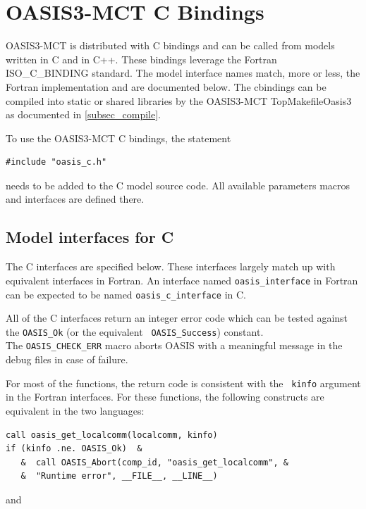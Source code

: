 \newpage
\chapter{OASIS3-MCT C Bindings}
\label{sec_cbindings}

OASIS3-MCT is distributed with C bindings and can be called from models written
in C and in C++.  These bindings leverage the Fortran ISO\_C\_BINDING standard.  The model
interface names match, more or less, the Fortran implementation and are documented
below.  The cbindings can be compiled into static or shared libraries by the
OASIS3-MCT TopMakefileOasis3 as documented in \ref{subsec_compile}.

To use the OASIS3-MCT C bindings, the statement

\begin{verbatim}
#include "oasis_c.h"
\end{verbatim}

needs to be added to the C model source code.  All available
parameters macros and
interfaces are defined there.


\section{Model interfaces for C}
\label{sec_cinterfaces}

The C interfaces are specified below.  These interfaces largely match
up with equivalent interfaces in Fortran.  An interface named
{\tt oasis\_interface} in Fortran can be expected to be named
{\tt oasis\_c\_interface} in C.

All of the C interfaces return an integer error code which can be
tested against the {\tt OASIS\_Ok} (or the equivalent {\tt
  OASIS\_Success}) constant.\\
The {\tt OASIS\_CHECK\_ERR} macro aborts
OASIS with a meaningful message in the debug files in case of failure.

For most of the functions,
the return code is consistent with the {\tt
  kinfo} argument in the Fortran interfaces.  For these functions, the
following constructs are equivalent in the two languages:

\begin{verbatim}
call oasis_get_localcomm(localcomm, kinfo)
if (kinfo .ne. OASIS_Ok)  &
   &  call OASIS_Abort(comp_id, "oasis_get_localcomm", &
   &  "Runtime error", __FILE__, __LINE__)
\end{verbatim}

and

